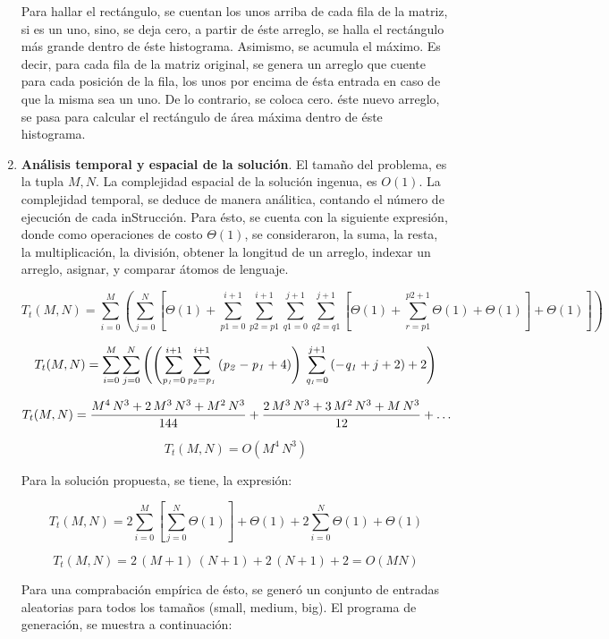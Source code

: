 \documentclass[11pt,spanish]{article}
\begin{document}
\begin{enumerate}
Para hallar el rectángulo, se cuentan los unos arriba de cada fila de la matriz, si es un uno, sino, se deja cero, a partir de éste arreglo, se halla el rectángulo más grande dentro de éste histograma. Asimismo, se acumula el máximo. Es decir, para cada fila de la matriz original, se genera un arreglo que cuente para cada posición de la fila, los unos por encima de ésta entrada en caso de que la misma sea un uno. De lo contrario, se coloca cero. éste nuevo arreglo, se pasa para calcular el rectángulo de área máxima dentro de éste histograma.


\item \textbf{Análisis temporal y espacial de la solución}. El tamaño del problema, es la tupla $M, N$. La complejidad espacial de la solución ingenua, es $O(1)$. La complejidad  temporal, se deduce de manera análitica, contando el número de ejecución de cada inStrucción. Para ésto, se cuenta con la siguiente expresión, donde como operaciones de costo $\Theta(1)$, se consideraron, la suma, la resta, la multiplicación, la división, obtener la longitud de un arreglo, indexar un arreglo, asignar, y comparar átomos de lenguaje.
	
	$$T_{t}(M, N) = \sum_{i=0}^{M} \left( \sum_{j=0}^{N} \left[ \Theta(1) + \sum_{p1=0}^{i + 1} \sum_{p2=p1}^{i+1} \sum_{q1=0}^{j+1} \sum_{q2=q1}^{j+1} \left[ \Theta(1) + \sum_{r=p1}^{p2+1} \Theta(1) + \Theta(1) \right]  + \Theta(1)\right] \right)$$
	
	$$T_{t}(M, N) = \sum_{i=0}^{M}{\sum_{j=0}^{N}{\left(\left(\sum_{{\it p_1}=0}^{i+1}{
 \sum_{{\it p_2}={\it p_1}}^{i+1}{\left({\it p_2}-{\it p_1}+4\right)}
 }\right)\,\sum_{{\it q_1}=0}^{j+1}{\left(-{\it q_1}+j+2\right)}+2
 \right)}}$$
 
 $$T_{t}(M, N) = {{M^4\,N^3+2\,M^3\,N^3+M^2\,N^3}\over{144}}+{{2\,M^3\,N^3+3\,M^2\,N
 ^3+M\,N^3}\over{12}}+ \dots$$
 
 $$T_{t}(M, N) = O(M^4\,N^3)$$
 
 Para la solución propuesta, se tiene, la expresión:
 
 $$T_{t}(M, N) = 2 \sum_{i=0}^{M} \left[ \sum_{j=0}^{N} \Theta(1)\right]+ \Theta(1) + 2 \sum_{i=0}^{N} \Theta(1) + \Theta(1)$$
 
 $$T_{t}(M, N) = 2\,\left(M+1\right)\,\left(N+1\right)+2\,\left(N+1\right)+2 = O(MN)$$
 
 Para una comprabación empírica de ésto, se generó un conjunto de entradas aleatorias para todos los tamaños (small, medium, big). El programa de generación, se muestra a continuación:
 

\end{enumerate}
\end{document}
